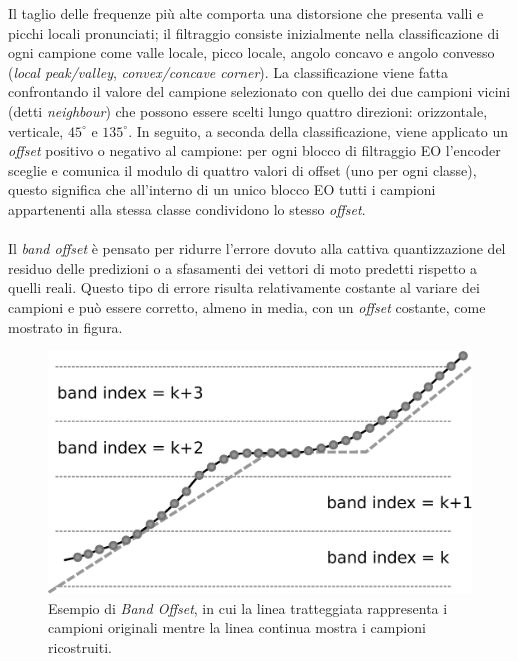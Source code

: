 Il taglio delle frequenze più alte comporta una distorsione che presenta valli e
picchi locali pronunciati; il filtraggio consiste inizialmente nella 
classificazione di ogni campione come valle locale, picco locale, angolo concavo
e angolo convesso (\emph{local peak/valley}, \emph{convex/concave corner}).
La classificazione viene fatta confrontando il valore del campione selezionato 
con quello dei due campioni vicini (detti \emph{neighbour}) che possono essere 
scelti lungo quattro direzioni: orizzontale, verticale, $45^{\circ}$ e 
$135^{\circ}$. In seguito, a seconda della classificazione, viene applicato un
\emph{offset} positivo o negativo al campione: per ogni blocco di filtraggio EO
l'encoder sceglie e comunica il modulo di quattro valori di offset (uno per ogni
classe), questo significa che all'interno di un unico blocco EO tutti i campioni
appartenenti alla stessa classe condividono lo stesso \emph{offset}.
\\ \\
Il \emph{band offset} è pensato per ridurre l'errore dovuto alla cattiva 
quantizzazione del residuo delle predizioni o a sfasamenti dei vettori di moto 
predetti rispetto a quelli reali. Questo tipo di errore risulta relativamente 
costante al variare dei campioni e può essere corretto, almeno in media, con un 
\emph{offset} costante, come mostrato in figura.

\begin{figure}[H]
  \centering
  \captionsetup{justification=raggedright}
	  \includegraphics[scale=0.37]{Figures/Band_offset}
  \caption[Esempio di \emph{Band Offset}]
  	  {Esempio di \emph{Band Offset}, in cui la linea tratteggiata
	   rappresenta i campioni originali mentre la linea continua mostra
	   i campioni ricostruiti.}
\end{figure}


